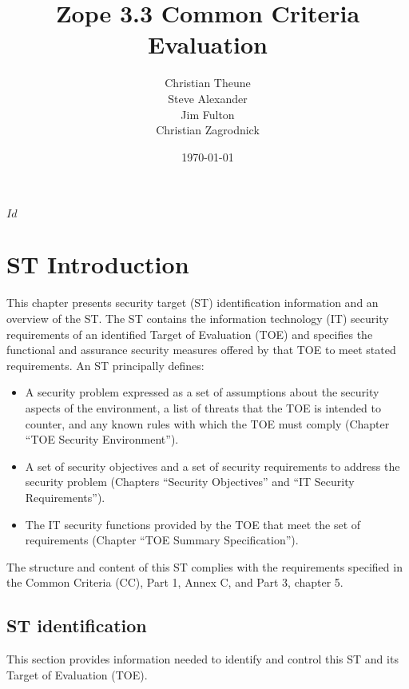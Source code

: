 \documentclass[12pt,english]{scrbook}
\title{Zope 3.3 Common Criteria Evaluation}
\author{Christian Theune \\
  Steve Alexander \\
  Jim Fulton \\
  Christian Zagrodnick}
\date{\today}
\begin{document}
\svnInfo $Id$

\maketitle
\tableofcontents
\newpage
\listoftables

\chapter{ST Introduction}

This chapter presents security target (ST) identification information and an
overview of the ST. The ST contains the information technology (IT) security
requirements of an identified Target of Evaluation (TOE) and specifies the
functional and assurance security measures offered by that TOE to meet stated
requirements. An ST principally defines:

\begin{itemize}
    \item A security problem expressed as a set of assumptions about the
    security aspects of the environment, a list of threats that the TOE is
    intended to counter, and any known rules with which the TOE must comply
    (Chapter ``TOE Security Environment'').

    \item A set of security objectives and a set of security requirements to
    address the security problem (Chapters ``Security Objectives'' and ``IT
    Security Requirements'').

    \item The IT security functions provided by the TOE that meet the set of
    requirements (Chapter ``TOE Summary Specification'').
\end{itemize}

The structure and content of this ST complies with the requirements specified
in the Common Criteria (CC), Part 1, Annex C, and Part 3, chapter 5.

\section{ST identification}

This section provides information needed to identify and control this ST and
its Target of Evaluation (TOE).
\end{document}
